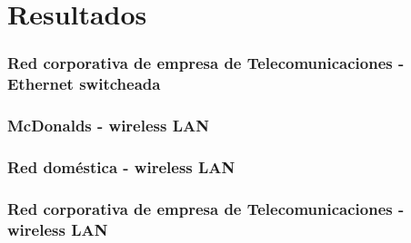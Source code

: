 \section{Resultados}\label{sec:resultados}

\subsubsection{Red corporativa de empresa de Telecomunicaciones - Ethernet switcheada}


\subsubsection{McDonalds - wireless LAN}

\subsubsection{Red doméstica - wireless LAN}

\subsubsection{Red corporativa de empresa de Telecomunicaciones - wireless LAN}
